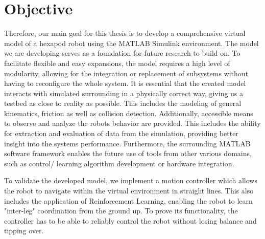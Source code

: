 \section{Objective}
Therefore, our main goal for this thesis is to develop a comprehensive virtual model of a hexapod robot using the MATLAB Simulink\textsuperscript{\textregistered} environment.
The model we are developing serves as a foundation for future research to build on.
To facilitate flexible and easy expansions, the model requires a high level of modularity, allowing for the integration or replacement of subsystems without having to reconfigure the whole system.
It is essential that the created model interacts with simulated surrounding in a physically correct way, giving us a testbed as close to reality as possible.
This includes the modeling of general kinematics, friction as well as collision detection.
Additionally, accessible means to observe and analyze the robots behavior are provided.
This includes the ability for extraction and evaluation of data from the simulation, providing better insight into the systems performance.
Furthermore, the surrounding MATLAB software framework enables the future use of tools from other various domains, such as control/ learning algorithm development or hardware integration.

To validate the developed model, we implement a motion controller which allows the robot to navigate within the virtual environment in straight lines. This also includes the application of Reinforcement Learning, enabling the robot to learn "inter-leg" coordination from the ground up.
To prove its functionality, the controller has to be able to reliably control the robot without losing balance and tipping over.




